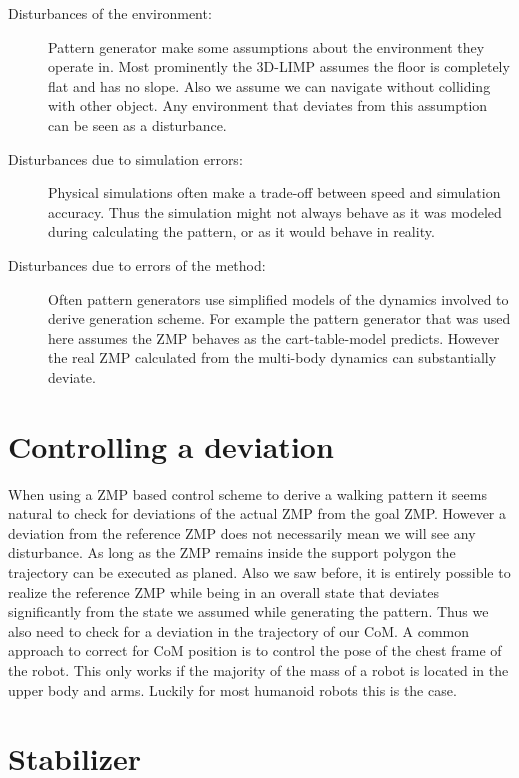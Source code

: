 \documentclass[english,ngerman]{KITreprt}
\begin{document}
\begin{description}
\item[Disturbances of the environment:]
Pattern generator make some assumptions about the environment they
operate in. Most prominently the 3D-LIMP assumes the floor is completely
flat and has no slope. Also we assume we can navigate without colliding
with other object. Any environment that deviates from this assumption
can be seen as a disturbance.
\item[Disturbances due to simulation errors:]
Physical simulations often make a trade-off between speed and simulation
accuracy. Thus the simulation might not always behave as it was modeled
during calculating the pattern, or as it would behave in reality.
\item[Disturbances due to errors of the method:]
Often pattern generators use simplified models of the dynamics involved
to derive generation scheme. For example the pattern generator that was
used here assumes the ZMP behaves as the cart-table-model predicts.
However the real ZMP calculated from the multi-body dynamics can
substantially deviate.
\end{description}

\section{Controlling a deviation}\label{controlling-a-deviation}

When using a ZMP based control scheme to derive a walking pattern it
seems natural to check for deviations of the actual ZMP from the goal
ZMP. However a deviation from the reference ZMP does not necessarily
mean we will see any disturbance. As long as the ZMP remains inside the
support polygon the trajectory can be executed as planed. Also we saw
before, it is entirely possible to realize the reference ZMP while being
in an overall state that deviates significantly from the state we
assumed while generating the pattern. Thus we also need to check for a
deviation in the trajectory of our CoM. A common approach to correct for
CoM position is to control the pose of the chest frame of the robot.
This only works if the majority of the mass of a robot is located in the
upper body and arms. Luckily for most humanoid robots this is the case.

\section{Stabilizer}\label{section:stabilizer}
\end{document}
